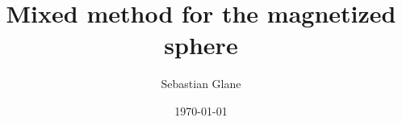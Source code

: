 \documentclass[%
	paper=letter,
	twoside=false,
	fontsize=12pt,
	titlepage=false,
	listof=totoc,
	bibliography=totoc,
	listof=flat,
	cleardoublepage=empty,
	headsepline=true,
	footsepline=false,
	captions=tableheading,
	numbers=noendperiod,
	headings=normal,
]{scrartcl}
\begin{document}
\title{Mixed method for the magnetized sphere}
\author{Sebastian Glane}
\date{\today}
\maketitle
\tableofcontents

\cleardoublepage
\printbibliography
\end{document}
